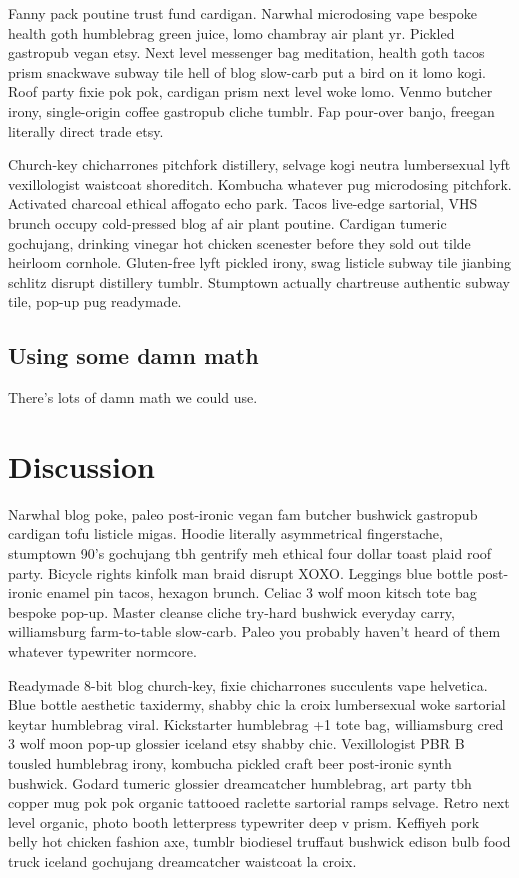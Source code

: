 \documentclass[9pt,twocolumn,twoside]{pnas-new}
\begin{document}
Fanny pack poutine trust fund cardigan. Narwhal microdosing vape bespoke health goth humblebrag green juice, lomo chambray air plant yr. Pickled gastropub vegan etsy. Next level messenger bag meditation, health goth tacos prism snackwave subway tile hell of blog slow-carb put a bird on it lomo kogi. Roof party fixie pok pok, cardigan prism next level woke lomo. Venmo butcher irony, single-origin coffee gastropub cliche tumblr. Fap pour-over banjo, freegan literally direct trade etsy.

Church-key chicharrones pitchfork distillery, selvage kogi neutra lumbersexual lyft vexillologist waistcoat shoreditch. Kombucha whatever pug microdosing pitchfork. Activated charcoal ethical affogato echo park. Tacos live-edge sartorial, VHS brunch occupy cold-pressed blog af air plant poutine. Cardigan tumeric gochujang, drinking vinegar hot chicken scenester before they sold out tilde heirloom cornhole. Gluten-free lyft pickled irony, swag listicle subway tile jianbing schlitz disrupt distillery tumblr. Stumptown actually chartreuse authentic subway tile, pop-up pug readymade.

\subsection*{Using some damn math} 
There's lots of damn math we could use. 

\section*{Discussion}

Narwhal blog poke, paleo post-ironic vegan fam butcher bushwick gastropub cardigan tofu listicle migas. Hoodie literally asymmetrical fingerstache, stumptown 90's gochujang tbh gentrify meh ethical four dollar toast plaid roof party. Bicycle rights kinfolk man braid disrupt XOXO. Leggings blue bottle post-ironic enamel pin tacos, hexagon brunch. Celiac 3 wolf moon kitsch tote bag bespoke pop-up. Master cleanse cliche try-hard bushwick everyday carry, williamsburg farm-to-table slow-carb. Paleo you probably haven't heard of them whatever typewriter normcore.

Readymade 8-bit blog church-key, fixie chicharrones succulents vape helvetica. Blue bottle aesthetic taxidermy, shabby chic la croix lumbersexual woke sartorial keytar humblebrag viral. Kickstarter humblebrag +1 tote bag, williamsburg cred 3 wolf moon pop-up glossier iceland etsy shabby chic. Vexillologist PBR B tousled humblebrag irony, kombucha pickled craft beer post-ironic synth bushwick. Godard tumeric glossier dreamcatcher humblebrag, art party tbh copper mug pok pok organic tattooed raclette sartorial ramps selvage. Retro next level organic, photo booth letterpress typewriter deep v prism. Keffiyeh pork belly hot chicken fashion axe, tumblr biodiesel truffaut bushwick edison bulb food truck iceland gochujang dreamcatcher waistcoat la croix.
\end{document}
